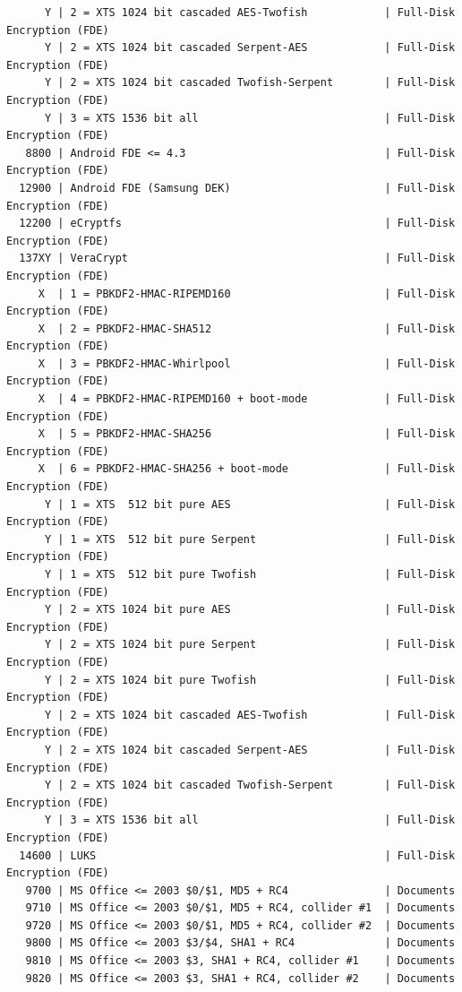 \documentclass{article}
\begin{document}
\begin{lstlisting}
      Y | 2 = XTS 1024 bit cascaded AES-Twofish            | Full-Disk Encryption (FDE)
      Y | 2 = XTS 1024 bit cascaded Serpent-AES            | Full-Disk Encryption (FDE)
      Y | 2 = XTS 1024 bit cascaded Twofish-Serpent        | Full-Disk Encryption (FDE)
      Y | 3 = XTS 1536 bit all                             | Full-Disk Encryption (FDE)
   8800 | Android FDE <= 4.3                               | Full-Disk Encryption (FDE)
  12900 | Android FDE (Samsung DEK)                        | Full-Disk Encryption (FDE)
  12200 | eCryptfs                                         | Full-Disk Encryption (FDE)
  137XY | VeraCrypt                                        | Full-Disk Encryption (FDE)
     X  | 1 = PBKDF2-HMAC-RIPEMD160                        | Full-Disk Encryption (FDE)
     X  | 2 = PBKDF2-HMAC-SHA512                           | Full-Disk Encryption (FDE)
     X  | 3 = PBKDF2-HMAC-Whirlpool                        | Full-Disk Encryption (FDE)
     X  | 4 = PBKDF2-HMAC-RIPEMD160 + boot-mode            | Full-Disk Encryption (FDE)
     X  | 5 = PBKDF2-HMAC-SHA256                           | Full-Disk Encryption (FDE)
     X  | 6 = PBKDF2-HMAC-SHA256 + boot-mode               | Full-Disk Encryption (FDE)
      Y | 1 = XTS  512 bit pure AES                        | Full-Disk Encryption (FDE)
      Y | 1 = XTS  512 bit pure Serpent                    | Full-Disk Encryption (FDE)
      Y | 1 = XTS  512 bit pure Twofish                    | Full-Disk Encryption (FDE)
      Y | 2 = XTS 1024 bit pure AES                        | Full-Disk Encryption (FDE)
      Y | 2 = XTS 1024 bit pure Serpent                    | Full-Disk Encryption (FDE)
      Y | 2 = XTS 1024 bit pure Twofish                    | Full-Disk Encryption (FDE)
      Y | 2 = XTS 1024 bit cascaded AES-Twofish            | Full-Disk Encryption (FDE)
      Y | 2 = XTS 1024 bit cascaded Serpent-AES            | Full-Disk Encryption (FDE)
      Y | 2 = XTS 1024 bit cascaded Twofish-Serpent        | Full-Disk Encryption (FDE)
      Y | 3 = XTS 1536 bit all                             | Full-Disk Encryption (FDE)
  14600 | LUKS                                             | Full-Disk Encryption (FDE)
   9700 | MS Office <= 2003 $0/$1, MD5 + RC4               | Documents
   9710 | MS Office <= 2003 $0/$1, MD5 + RC4, collider #1  | Documents
   9720 | MS Office <= 2003 $0/$1, MD5 + RC4, collider #2  | Documents
   9800 | MS Office <= 2003 $3/$4, SHA1 + RC4              | Documents
   9810 | MS Office <= 2003 $3, SHA1 + RC4, collider #1    | Documents
   9820 | MS Office <= 2003 $3, SHA1 + RC4, collider #2    | Documents

\end{lstlisting}
\end{document}
